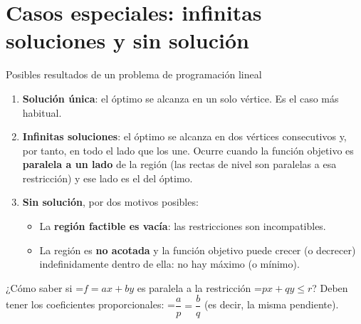 \documentclass[11pt,a4paper]{article}
\newcommand{\fmm}[1]{\setbox0=\hbox{$#1$}\ifdim\wd0>\linewidth\fmdisp{#1}\else\mbox{\box0}\fi}
\newcommand{\fmdisp}[1]{\[\setbox2=\hbox{$\displaystyle #1$}\ifdim\wd2>\linewidth\resizebox{\linewidth}{!}{\box2}\else\box2\fi\]}
\newcommand{\fmbadge}[2]{\tcbox[on line,colback=#1,colframe=#1,arc=2mm,boxsep=0pt,left=4pt,right=4pt,top=1.5pt,bottom=1.5pt]{\color{white}\footnotesize\bfseries #2}}
\begin{document}
\section{Casos especiales: infinitas soluciones y sin solución}\hypertarget{sec5}{}

\begin{fmprop}{Posibles resultados de un problema de programación lineal}
\begin{enumerate}
\item \fmbadge{fmok}{1} \textbf{Solución única}: el óptimo se alcanza en un solo vértice. Es el caso más habitual.
\item \fmbadge{fmev}{$\infty$} \textbf{Infinitas soluciones}: el óptimo se alcanza en dos vértices consecutivos y, por tanto, en todo el lado que los une. Ocurre cuando la función objetivo es \textbf{paralela a un lado} de la región (las rectas de nivel son paralelas a esa restricción) y ese lado es el del óptimo.
\item \fmbadge{fmas}{$\emptyset$} \textbf{Sin solución}, por dos motivos posibles:

\begin{itemize}
\item La \textbf{región factible es vacía}: las restricciones son incompatibles.
\item La región es \textbf{no acotada} y la función objetivo puede crecer (o decrecer) indefinidamente dentro de ella: no hay máximo (o mínimo).
\end{itemize}
\end{enumerate}

\begin{fmnote}¿Cómo saber si \fmm{f=ax+by} es paralela a la restricción \fmm{px+qy\leq r}? Deben tener los coeficientes proporcionales: \fmm{\dfrac{a}{p}=\dfrac{b}{q}} (es decir, la misma pendiente).\end{fmnote}
\end{fmprop}
\end{document}
